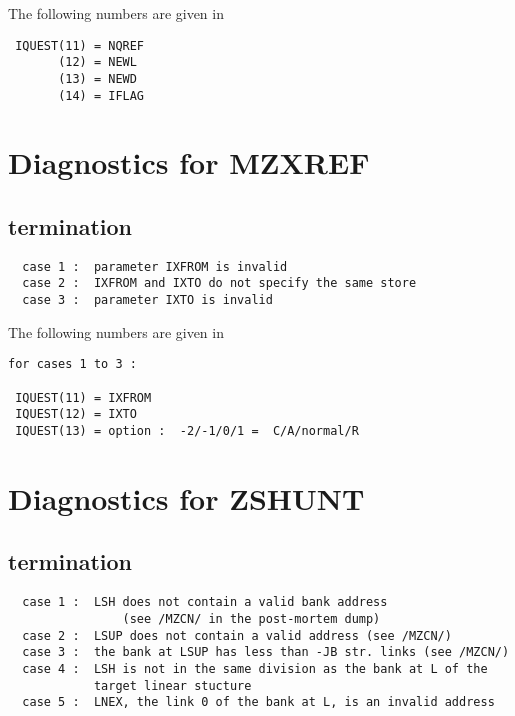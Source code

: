 The following numbers are given in 

\begin{verbatim}
 IQUEST(11) = NQREF
       (12) = NEWL
       (13) = NEWD
       (14) = IFLAG
\end{verbatim}

\section{Diagnostics for MZXREF}


\subsection*{ termination}

\begin{verbatim}
  case 1 :  parameter IXFROM is invalid
  case 2 :  IXFROM and IXTO do not specify the same store
  case 3 :  parameter IXTO is invalid
\end{verbatim}

The following numbers are given in 

\begin{verbatim}
for cases 1 to 3 :

 IQUEST(11) = IXFROM
 IQUEST(12) = IXTO
 IQUEST(13) = option :  -2/-1/0/1 =  C/A/normal/R
\end{verbatim}

\section{Diagnostics for ZSHUNT}


\subsection*{ termination}

\begin{verbatim}
  case 1 :  LSH does not contain a valid bank address
                (see /MZCN/ in the post-mortem dump)
  case 2 :  LSUP does not contain a valid address (see /MZCN/)
  case 3 :  the bank at LSUP has less than -JB str. links (see /MZCN/)
  case 4 :  LSH is not in the same division as the bank at L of the
            target linear stucture
  case 5 :  LNEX, the link 0 of the bank at L, is an invalid address
\end{verbatim}

